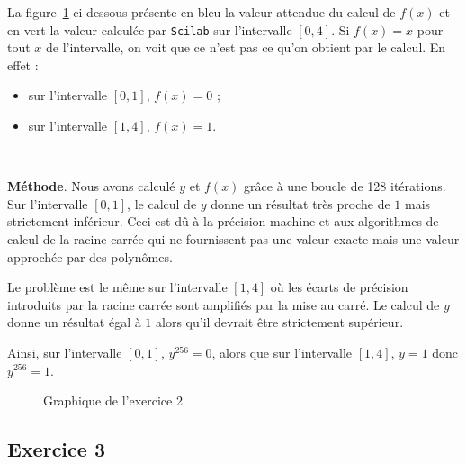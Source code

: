 \documentclass[a4paper,11pt]{article}
\theoremstyle{nonumberplain}
\theoremstyle{nonumberplain}
\begin{document}
    La figure~\ref{graph_exo2} ci-dessous présente en bleu la valeur attendue du calcul de $f(x)$ et en vert la valeur calculée par \texttt{Scilab} sur l'intervalle $[0, 4]$.
    Si $f(x) = x$ pour tout $x$ de l'intervalle, on voit que ce n'est pas ce qu'on obtient par le calcul. En effet :

    \begin{itemize}
        \item sur l'intervalle $[0, 1]$, $f(x) = 0$ ;
        \item sur l'intervalle $[1, 4]$, $f(x) = 1$.
    \end{itemize}~\newline

    \textbf{Méthode}. Nous avons calculé $y$ et $f(x)$ grâce à une boucle de 128 itérations.
    Sur l'intervalle $[0, 1]$, le calcul de $y$ donne un résultat très proche de $1$ mais strictement inférieur. Ceci est dû à la précision machine
    et aux algorithmes de calcul de la racine carrée qui ne fournissent pas une valeur exacte mais une valeur approchée par des polynômes.

    Le problème est le même sur l'intervalle $[1, 4]$ où les écarts de précision introduits par la racine carrée sont amplifiés par la mise au carré. Le calcul de $y$ donne
    un résultat égal à $1$ alors qu'il devrait être strictement supérieur.

    Ainsi, sur l'intervalle $[0, 1]$, $y^{256} = 0$, alors que sur l'intervalle $[1, 4]$, $y = 1$ donc $y^{256} = 1$.

    \begin{figure}
        \centering
        \caption{\label{graph_exo2} Graphique de l'exercice 2}
    \end{figure}


\subsection*{Exercice 3}
\end{document}
